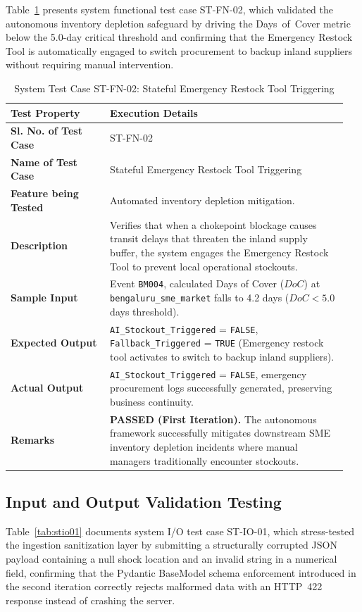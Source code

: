Table~\ref{tab:stfn02} presents system functional test case ST-FN-02, which validated the autonomous inventory depletion safeguard by driving the Days~of~Cover metric below the 5.0-day critical threshold and confirming that the Emergency Restock Tool is automatically engaged to switch procurement to backup inland suppliers without requiring manual intervention.

\begin{table}[H]
    \centering
    \caption{System Test Case ST-FN-02: Stateful Emergency Restock Tool Triggering}
    \label{tab:stfn02}
    \begin{tabular}{|p{0.28\linewidth}|p{0.67\linewidth}|}
        \hline
        \textbf{Test Property} & \textbf{Execution Details} \\ \hline
        \textbf{Sl. No. of Test Case} & ST-FN-02 \\ \hline
        \textbf{Name of Test Case} & Stateful Emergency Restock Tool Triggering \\ \hline
        \textbf{Feature being Tested} & Automated inventory depletion mitigation. \\ \hline
        \textbf{Description} & Verifies that when a chokepoint blockage causes transit delays that threaten the inland supply buffer, the system engages the Emergency Restock Tool to prevent local operational stockouts. \\ \hline
        \textbf{Sample Input} & Event \texttt{BM004}, calculated Days of Cover ($DoC$) at \texttt{bengaluru\_sme\_market} falls to 4.2 days ($DoC < 5.0$ days threshold). \\ \hline
        \textbf{Expected Output} & \texttt{AI\_Stockout\_Triggered} = \texttt{FALSE}, \texttt{Fallback\_Triggered} = \texttt{TRUE} (Emergency restock tool activates to switch to backup inland suppliers). \\ \hline
        \textbf{Actual Output} & \texttt{AI\_Stockout\_Triggered} = \texttt{FALSE}, emergency procurement logs successfully generated, preserving business continuity. \\ \hline
        \textbf{Remarks} & \textbf{PASSED (First Iteration).} The autonomous framework successfully mitigates downstream SME inventory depletion incidents where manual managers traditionally encounter stockouts. \\ \hline
    \end{tabular}
\end{table}

\subsection{Input and Output Validation Testing}
Table~\ref{tab:stio01} documents system I/O test case ST-IO-01, which stress-tested the ingestion sanitization layer by submitting a structurally corrupted JSON payload containing a null shock location and an invalid string in a numerical field, confirming that the Pydantic BaseModel schema enforcement introduced in the second iteration correctly rejects malformed data with an HTTP~422 response instead of crashing the server.

